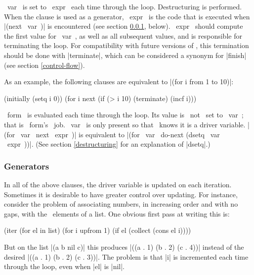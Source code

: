 \begin{clauses}


~var~ is set to ~expr~ each time through the loop.  Destructuring is
performed.  When the clause is used as a generator, ~expr~ is the code
that is executed when |(next ~var~)| is
encountered (see section \ref{generators}, below).
~expr~ should compute the first value for ~var~, as well
as all subsequent values, and is responsible for terminating the loop.
For compatibility with future versions of \iter, this termination
should be done with |terminate|, which can be
considered a synonym for |finish| (see section \ref{control-flow}).

\cpar As an example, the following clauses are equivalent to |(for
i from 1 to 10)|:
\begin{program}
(initially (setq i 0))
(for i next (if (> i 10) (terminate) (incf i)))
\end{program}

~form~ is evaluated each time through the loop.  Its value is ~not~
set to ~var~; that is ~form's~ job. ~var~ is only present so that
\iter\ knows it is a driver variable.  \linebreak |(for ~var~ next
~expr~)| is equivalent to |(for ~var~ do-next (dsetq ~var~ ~expr~))|.
(See section \ref{destructuring} for an explanation of |dsetq|.)

\end{clauses}

\subsubsection{Generators}
\label{generators}

In all of the above clauses, the driver variable is updated on each
iteration.
Sometimes it is desirable to have greater control over updating.
For instance, consider the problem of associating numbers, in
increasing order and with no gaps, with the
\nonnil\ elements of a list.  One obvious first pass at writing this is:

\begin{program}
(iter (for el in list)
      (for i upfrom 1)
      (if el (collect (cons el i))))
\end{program}
But on the list |(a b nil c)| this produces |((a . 1) (b . 2) (c .
4))| instead of the desired |((a . 1) (b . 2) (c . 3))|.  The problem
is that |i| is incremented each time through the loop, even when |el|
is |nil|.

